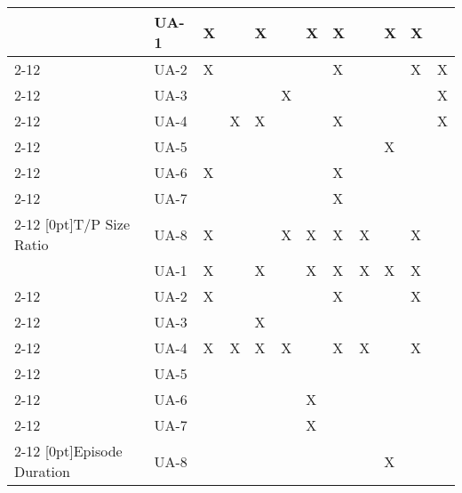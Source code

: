 \begin{table}[!htbp]
\begin{tabular}{|l|l|l|l|l|l|l|l|l|l|l|l|}
        &  UA-1 &  X  &     &  X  &     &  X  &  X  &     &  X  &  X  &     \\ \cline{2-12} 
    &  UA-2 &  X  &     &     &     &     &  X  &     &     &  X  &  X  \\ \cline{2-12} 
    &  UA-3 &     &     &     &  X  &     &     &     &     &     &  X  \\ \cline{2-12}  
    &  UA-4 &     &  X  &  X  &     &     &  X  &     &     &     &  X  \\ \cline{2-12} 
    &  UA-5 &     &     &     &     &     &     &     &  X  &     &     \\ \cline{2-12} 
    &  UA-6 &  X  &     &     &     &     &  X  &     &     &     &     \\ \cline{2-12} 
    &  UA-7 &     &     &     &     &     &  X  &     &     &     &     \\ \cline{2-12} 
\raisebox{10ex}[0pt]{T/P Size Ratio}  
    &  UA-8 &  X  &     &     &  X  &  X  &  X  &  X  &     &  X  &     \\ \hline
    
    &  UA-1 &  X  &     &  X  &     &  X  &  X  &  X  &  X  &  X  &     \\ \cline{2-12}   
    &  UA-2 &  X  &     &     &     &     &  X  &     &     &  X  &     \\ \cline{2-12} 
    &  UA-3 &     &     &  X  &     &     &     &     &     &     &     \\ \cline{2-12}    
    &  UA-4 &  X  &  X  &  X  &  X  &     &  X  &  X  &     &  X  &     \\ \cline{2-12} 
    &  UA-5 &     &     &     &     &     &     &     &     &     &     \\ \cline{2-12}    
    &  UA-6 &     &     &     &     &  X  &     &     &     &     &     \\ \cline{2-12} 
    &  UA-7 &     &     &     &     &  X  &     &     &     &     &     \\ \cline{2-12} 
\raisebox{10ex}[0pt]{Episode Duration}  
    &  UA-8 &     &     &     &     &     &     &     &  X  &     &     \\ \hline
    

\end{tabular}
\end{table}
